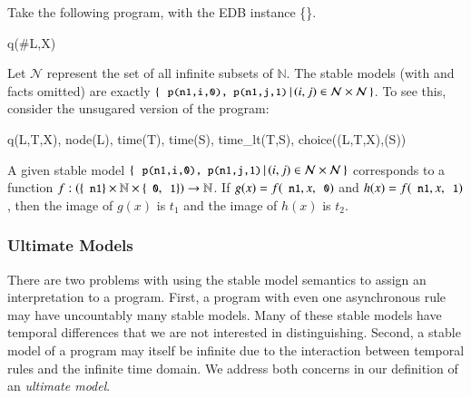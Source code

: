 \begin{example}
\label{ex:uncountable}
Take the following \lang program, with the EDB instance \{\}.

\begin{Drules}
        {q(#L,X)}
\end{Drules}

Let $\mathcal{N}$ represent the set of all infinite subsets of $\mathbb{N}$.
The stable models (with  and  facts omitted) are exactly \linebreak $\{ \, \dedalus{p(n1,i,0), p(n1,j,1)} \, | \, (i,j) \in \mathcal{N}
\times \mathcal{N} \, \}$.  To see this, consider the unsugared version of the program:

\begin{Drules}
        {q(L,T,X), node(L), time(T), time(S), time_lt(T,S), choice((L,T,X),(S))}
\end{Drules}

A given stable model $\{ \, \dedalus{p(n1,i,0), p(n1,j,1)} \, | \, (i,j)\in \mathcal{N}                                                    
\times \mathcal{N} \, \}$ corresponds to a function $f : \left(\{\dedalus{n1}\} \times \mathbb{N} \times \{\dedalus{0},\dedalus{1}\}\right) \rightarrow \mathbb{N}$.  If $g(x) = f(\dedalus{n1}, x, \dedalus{0})$ and $h(x) = f(\dedalus{n1}, x, \dedalus{1})$, then the image of $g(x)$ is $t_1$ and the image of $h(x)$ is $t_2$.
\end{example}


\subsubsection{Ultimate Models}
There are two problems with using the stable model semantics to assign an
interpretation to a \lang program. First, a program with even one asynchronous
rule may have uncountably many stable models.  Many of these stable models have
temporal differences that we are not interested in distinguishing.  Second, a
stable model of a \lang program may itself be infinite due to the interaction
between temporal rules and the infinite time domain.
We address both concerns in our definition of an {\em ultimate
  model}.

